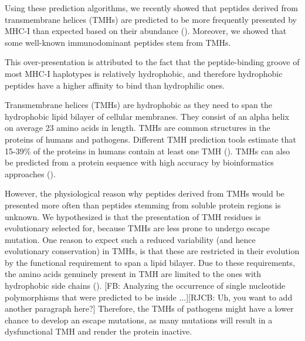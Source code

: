 
Using these prediction algorithms, 
we recently showed that peptides derived 
from transmembrane helices (TMHs) 
are predicted to be more frequently presented by MHC-I 
than expected based on their abundance (\cite{bianchi2017}). 
Moreover, we showed that some well-known immunodominant peptides stem from TMHs. 

This over-presentation is attributed to the fact 
that the peptide-binding groove of most MHC-I haplotypes 
is relatively hydrophobic, 
and therefore hydrophobic peptides have a higher affinity to bind
than hydrophilic ones. 

Transmembrane helices (TMHs) are hydrophobic 
as they need to span the hydrophobic lipid bilayer of cellular membranes.
They consist of an alpha helix on average 23 amino acids in length. 
TMHs are common structures in the proteins of humans and pathogens. 
Different TMH prediction tools estimate
that 15-39\% of the proteins in humans 
contain at least one TMH (\cite{ahram2006estimation}).
TMHs can also be predicted from a protein sequence 
with high accuracy by bioinformatics approaches (\cite{krogh2001predicting,bianchi2017,kall2004combined,arai2004conpred,jones2007improving,klammer2009metatm,wang2019efficient}).

However, the physiological reason why peptides derived from TMHs 
would be presented more often than peptides 
stemming from soluble protein regions is unknown. 
We hypothesized is that the presentation of 
TMH residues is evolutionary selected for, 
because TMHs are less prone to undergo escape mutation. 
One reason to expect such a reduced 
variability (and hence evolutionary conservation) in TMHs, 
is that these are restricted in their evolution 
by the functional requirement to span a lipid bilayer. 
Due to these requirements, 
the amino acids genuinely present in TMH 
are limited to the ones with hydrophobic side chains (\cite{jones1994model}).
[FB: Analyzing the occurrence of single nucleotide polymorphisms 
that were predicted to be inside ...][RJCB: Uh, you want to add another
paragraph here?]
Therefore, the TMHs of pathogens 
might have a lower chance to develop an escape mutations, 
as many mutations will result in a dysfunctional TMH 
and render the protein inactive.

